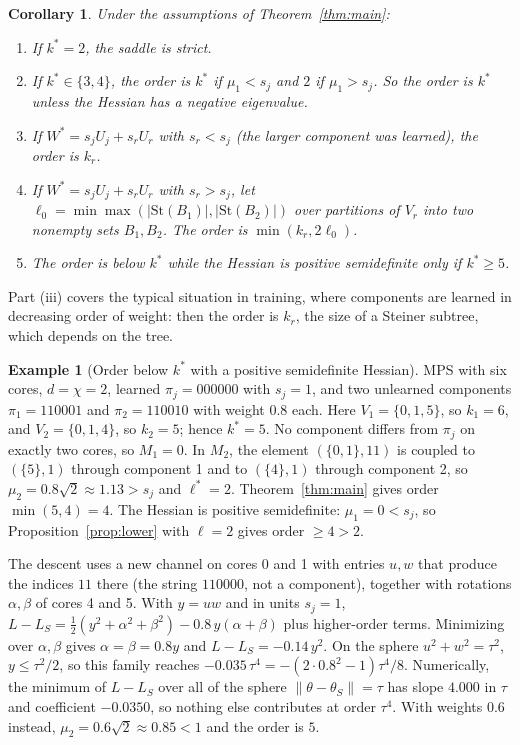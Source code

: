 \documentclass[11pt]{article}
\newtheorem{corollary}{Corollary}
\theoremstyle{definition}
\newtheorem{example}{Example}
\newcommand{\St}{\mathrm{St}}
\begin{document}
\begin{corollary}\label{cor:cases}
Under the assumptions of Theorem~\ref{thm:main}:
\begin{enumerate}[label=(\roman*)]
\item If $k^*=2$, the saddle is strict.
\item If $k^*\in\{3,4\}$, the order is $k^*$ if $\mu_1<s_j$ and $2$ if $\mu_1>s_j$. So the order is $k^*$ unless the
Hessian has a negative eigenvalue.
\item If $W^*=s_jU_j+s_rU_r$ with $s_r<s_j$ (the larger component was learned), the order is $k_r$.
\item If $W^*=s_jU_j+s_rU_r$ with $s_r>s_j$, let $\ell_0=\min\max(\lvert\St(B_1)\rvert,\lvert\St(B_2)\rvert)$ over partitions of
$V_r$ into two nonempty sets $B_1,B_2$. The order is $\min(k_r,2\ell_0)$.
\item The order is below $k^*$ while the Hessian is positive semidefinite only if $k^*\ge5$.
\end{enumerate}
\end{corollary}

Part (iii) covers the typical situation in training, where components are learned in decreasing order of weight:
then the order is $k_r$, the size of a Steiner subtree, which depends on the tree.

\begin{example}[Order below $k^*$ with a positive semidefinite Hessian]\label{ex:pairstar}
MPS with six cores, $d=\chi=2$, learned $\pi_j=000000$ with $s_j=1$, and two unlearned components $\pi_1=110001$ and
$\pi_2=110010$ with weight $0.8$ each. Here $V_1=\{0,1,5\}$, so $k_1=6$, and $V_2=\{0,1,4\}$, so $k_2=5$; hence $k^*=5$.
No component differs from $\pi_j$ on exactly two cores, so $M_1=0$. In $M_2$, the element $(\{0,1\},11)$ is coupled to
$(\{5\},1)$ through component 1 and to $(\{4\},1)$ through component 2, so $\mu_2=0.8\sqrt2\approx1.13>s_j$ and
$\ell^*=2$. Theorem~\ref{thm:main} gives order $\min(5,4)=4$. The Hessian is positive semidefinite: $\mu_1=0<s_j$, so
Proposition~\ref{prop:lower} with $\ell=2$ gives order $\ge4>2$.

The descent uses a new channel on cores 0 and 1 with entries $u,w$ that produce the indices $11$ there (the string
$110000$, not a component), together with rotations $\alpha,\beta$ of cores 4 and 5. With $y=uw$ and in units $s_j=1$,
$L-L_S=\frac12(y^2+\alpha^2+\beta^2)-0.8\,y(\alpha+\beta)$ plus higher-order terms. Minimizing over $\alpha,\beta$ gives
$\alpha=\beta=0.8y$ and $L-L_S=-0.14\,y^2$. On the sphere $u^2+w^2=\tau^2$, $y\le\tau^2/2$, so this family reaches
$-0.035\,\tau^4=-(2\cdot0.8^2-1)\tau^4/8$. Numerically, the minimum of $L-L_S$ over all of the sphere
$\lVert\theta-\theta_S\rVert=\tau$ has slope $4.000$ in $\tau$ and coefficient $-0.0350$, so nothing else contributes at order
$\tau^4$. With weights $0.6$ instead, $\mu_2=0.6\sqrt2\approx0.85<1$ and the order is $5$.
\end{example}
\end{document}
